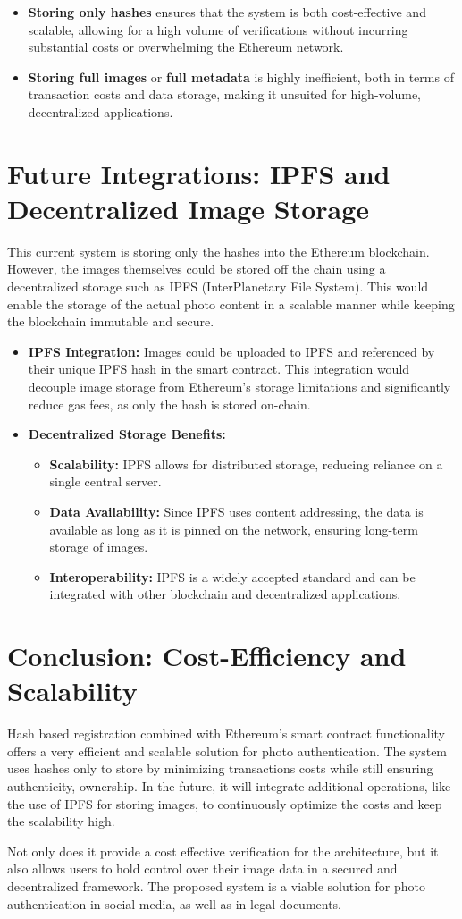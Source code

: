 \begin{itemize}
    \item \textbf{Storing only hashes} ensures that the system is both cost-effective and scalable, allowing for a high volume of verifications without incurring substantial costs or overwhelming the Ethereum network.
    \item \textbf{Storing full images} or \textbf{full metadata} is highly inefficient, both in terms of transaction costs and data storage, making it unsuited for high-volume, decentralized applications.
\end{itemize}

\section{Future Integrations: IPFS and Decentralized Image Storage}
This current system is storing only the hashes into the Ethereum blockchain. However, the images themselves could be stored off the chain using a decentralized storage such as IPFS (InterPlanetary File System). This would enable the storage of the actual photo content in a scalable manner while keeping the blockchain immutable and secure.

\begin{itemize}
    \item {\textbf{IPFS Integration:}} Images could be uploaded to IPFS and referenced by their unique IPFS hash in the smart contract. This integration would decouple image storage from Ethereum's storage limitations and significantly reduce gas fees, as only the hash is stored on-chain.
    \item {\textbf{Decentralized Storage Benefits:}}
        \begin{itemize}
            \item \textbf{Scalability:} IPFS allows for distributed storage, reducing reliance on a single central server.
            \item \textbf{Data Availability:} Since IPFS uses content addressing, the data is available as long as it is pinned on the network, ensuring long-term storage of images.
            \item \textbf{Interoperability:} IPFS is a widely accepted standard and can be integrated with other blockchain and decentralized applications.
        \end{itemize}
\end{itemize}

\section{Conclusion: Cost-Efficiency and Scalability}
Hash based registration combined with Ethereum’s smart contract functionality offers a very efficient and scalable solution for photo authentication. 
The system uses hashes only to store by minimizing transactions costs while still ensuring authenticity, ownership. In the future, it will integrate additional operations, like the use of IPFS for storing images, to continuously optimize the costs and keep the scalability high.

Not only does it provide a cost effective verification for the architecture, but it also allows users to hold control over their image data in a secured and decentralized framework. The proposed system is a viable solution for photo authentication in social media, as well as in legal documents.
